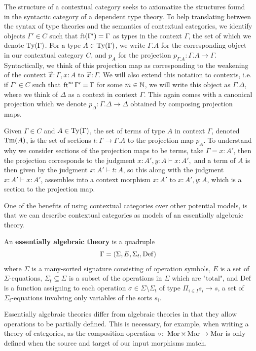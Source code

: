 \documentclass{amsart}
\begin{document}
The structure of a contextual category seeks to axiomatize the structures found in the syntactic category of a dependent type theory. To help translating between the syntax of type theories and the semantics of contextual categories, we identify objects $\Gamma'\in C$ such that $\operatorname{ft}(\Gamma')=\Gamma$ as types in the context $\Gamma$, the set of which we denote $\operatorname{Ty}(\Gamma)$. For a type $A\in\operatorname{Ty}(\Gamma)$, we write $\Gamma.A$ for the corresponding object in our contextual category $C$, and $p_A$ for the projection $p_{\Gamma.A}\colon\Gamma.A\to\Gamma$. Syntactically, we think of this projection map as corresponding to the weakening of the context $\vec x:\Gamma,x:A$ to $\vec x:\Gamma$. We will also extend this notation to contexts, i.e. if $\Gamma'\in C$ such that $\operatorname{ft}^m\Gamma'=\Gamma$ for some $m\in\mathbb{N}$, we will write this object as $\Gamma.\Delta$, where we think of $\Delta$ as a context in context $\Gamma$. This again comes with a canonical projection which we denote $p_\Delta\colon\Gamma.\Delta\to\Delta$ obtained by composing projection maps.

Given $\Gamma\in C$ and $A\in\operatorname{Ty}(\Gamma)$, the set of terms of type $A$ in context $\Gamma$, denoted $\operatorname{Tm}(A)$, is the set of sections $t\colon\Gamma\to\Gamma.A$ to the projection map $p_A$. To understand why we consider sections of the projection maps to be terms, take $\Gamma=x:A'$, then the projection corresponds to the judgment $x:A',y:A\vdash x:A',$ and a term of $A$ is then given by the judgment $x:A'\vdash t:A$, so this along with the judgment $x:A'\vdash x:A'$, assembles into a context morphism $x:A'$ to $x:A',y:A$, which is a section to the projection map.

One of the benefits of using contextual categories over other potential models, is that we can describe contextual categories as models of an essentially algebraic theory.

\begin{defn}\cite[Def. 3.34]{AR}
    An \textbf{essentially algebraic theory} is a quadruple
    $$ \Gamma=(\Sigma,E,\Sigma_t,\operatorname{Def}) $$
    where $\Sigma$ is a many-sorted signature consisting of operation symbols, $E$ is a set of $\Sigma$-equations, $\Sigma_t\subseteq\Sigma$ is a subset of the operations in $\Sigma$ which are "total", and $\operatorname{Def}$ is a function assigning to each operation $\sigma\in\Sigma\setminus\Sigma_t$ of type $\Pi_{i\in I}s_i\to s$, a set of $\Sigma_t$-equations involving only variables of the sorts $s_i$.
\end{defn}
Essentially algebraic theories differ from algebraic theories in that they allow operations to be partially defined. This is necessary, for example, when writing a theory of categories, as the composition operation $\circ\colon\operatorname{Mor}\times\operatorname{Mor}\to \operatorname{Mor}$ is only defined when the source and target of our input morphisms match.
\end{document}

